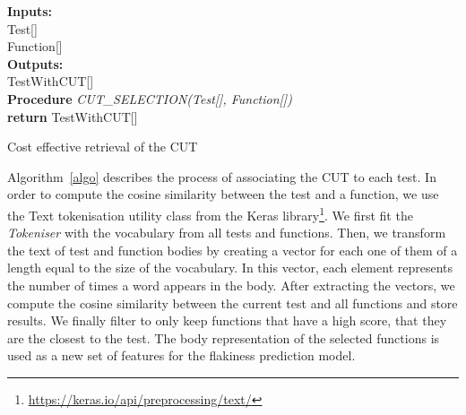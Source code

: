 \begin{algorithm}
\SetAlgoLined
\textbf{Inputs:}\\
Test[]\\
Function[]\\
\textbf{Outputs:}\\
TestWithCUT[]\\
\textbf{Procedure} \emph{CUT\_SELECTION(Test[], Function[])}\\
 \textbf{return} TestWithCUT[]
 \caption{Cost effective retrieval of the CUT}
 \label{algo}
\end{algorithm}

Algorithm~\ref{algo} describes the process of associating the CUT to each test. 
In order to compute the cosine similarity between the test and a function, we use the Text tokenisation utility class from the Keras library\footnote{\url{https://keras.io/api/preprocessing/text/}}. 
We first fit the \emph{Tokeniser} with the vocabulary from all tests and functions. 
Then, we transform the text of test and function bodies by creating a vector for each one of them of a length equal to the size of the vocabulary.
In this vector, each element represents the number of times a word appears in the body. 
After extracting the vectors, we compute the cosine similarity between the current test and all functions and store results. 
We finally filter to only keep functions that have a high score, \ie that they are the closest to the test. 
The body representation of the selected functions is used as a new set of features for the flakiness prediction model.




